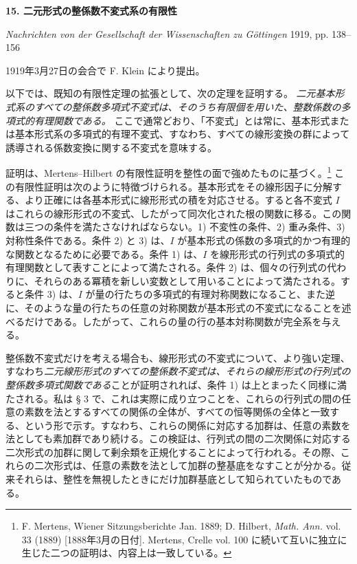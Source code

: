 \documentclass[11pt]{article}
\begin{document}
\providecommand{\frH}{\mathfrak H}
\providecommand{\frK}{\mathfrak K}
\providecommand{\frM}{\mathfrak M}
\providecommand{\frN}{\mathfrak N}
\providecommand{\frG}{\mathfrak G}
\providecommand{\frS}{\mathfrak S}
\providecommand{\tmod}[1]{\;(\operatorname{mod} #1)}

\clearpage
\begin{center}
{\Large\bfseries 15. 二元形式の整係数不変式系の有限性}\par
\vspace{1em}
\emph{Nachrichten von der Gesellschaft der Wissenschaften zu Göttingen} 1919, pp. 138--156
\end{center}

\vspace{2em}
\begin{center}
1919年3月27日の会合で F. Klein により提出。
\end{center}

以下では、既知の有限性定理の拡張として、次の定理を証明する。
\emph{二元基本形式系のすべての整係数多項式不変式は、そのうち有限個を用いた、整数係数の多項式的有理関数である。}
ここで通常どおり、「不変式」とは常に、基本形式または基本形式系の多項式的有理不変式、すなわち、すべての線形変換の群によって誘導される係数変換に関する不変式を意味する。

証明は、Mertens--Hilbert の有限性証明を整性の面で強めたものに基づく。\footnote{F. Mertens, Wiener Sitzungsberichte Jan. 1889; D. Hilbert, \emph{Math. Ann.} vol. 33 (1889) [1888年3月の日付]. Mertens, Crelle vol. 100 に続いて互いに独立に生じた二つの証明は、内容上は一致している。}
この有限性証明は次のように特徴づけられる。基本形式をその線形因子に分解する、より正確には各基本形式に線形形式の積を対応させる。すると各不変式 \(I\) はこれらの線形形式の不変式、したがって同次化された根の関数に移る。この関数は三つの条件を満たさなければならない。1) 不変性の条件、2) 重み条件、3) 対称性条件である。条件 2) と 3) は、\(I\) が基本形式の係数の多項式的かつ有理的な関数となるために必要である。条件 1) は、\(I\) を線形形式の行列式の多項式的有理関数として表すことによって満たされる。条件 2) は、個々の行列式の代わりに、それらのある冪積を新しい変数として用いることによって満たされる。すると条件 3) は、\(I\) が量の行たちの多項式的有理対称関数になること、また逆に、そのような量の行たちの任意の対称関数が基本形式の不変式になることを述べるだけである。したがって、これらの量の行の基本対称関数が完全系を与える。

整係数不変式だけを考える場合も、線形形式の不変式について、より強い定理、すなわち\emph{二元線形形式のすべての整係数不変式は、それらの線形形式の行列式の整係数多項式関数である}ことが証明されれば、条件 1) は上とまったく同様に満たされる。私は § 3 で、これは実際に成り立つことを、これらの行列式の間の任意の素数を法とするすべての関係の全体が、すべての恒等関係の全体と一致する、という形で示す。すなわち、これらの関係に対応する加群は、任意の素数を法としても素加群であり続ける。この検証は、行列式の間の二次関係に対応する二次形式の加群に関して剰余類を正規化することによって行われる。その際、これらの二次形式は、任意の素数を法として加群の整基底をなすことが分かる。従来それらは、整性を無視したときにだけ加群基底として知られていたものである。
\end{document}
